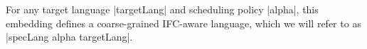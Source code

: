 
For any target language |targetLang| and scheduling policy |alpha|, this
embedding defines a coarse-grained IFC-aware language, which we will
refer to as |specLang alpha targetLang|.
